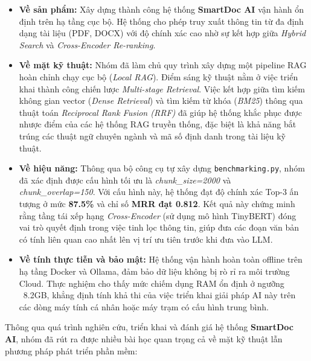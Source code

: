 ﻿\documentclass[10pt, conference, a4paper, compsocconf]{IEEEtran}
\begin{document}
\begin{itemize}
    \item \textbf{Về sản phẩm:} Xây dựng thành công hệ thống \textbf{SmartDoc AI} vận hành ổn định trên hạ tầng cục bộ. Hệ thống cho phép truy xuất thông tin từ đa định dạng tài liệu (PDF, DOCX) với độ chính xác cao nhờ sự kết hợp giữa \textit{Hybrid Search} và \textit{Cross-Encoder Re-ranking}.
   \item \textbf{Về mặt kỹ thuật:} Nhóm đã làm chủ quy trình xây dựng một pipeline RAG hoàn chỉnh chạy cục bộ (\textit{Local RAG}). Điểm sáng kỹ thuật nằm ở việc triển khai thành công chiến lược \textit{Multi-stage Retrieval}. Việc kết hợp giữa tìm kiếm không gian vector (\textit{Dense Retrieval}) và tìm kiếm từ khóa (\textit{BM25}) thông qua thuật toán \textit{Reciprocal Rank Fusion (RRF)} đã giúp hệ thống khắc phục được nhược điểm của các hệ thống RAG truyền thống, đặc biệt là khả năng bắt trúng các thuật ngữ chuyên ngành và mã số định danh trong tài liệu kỹ thuật.
    \item \textbf{Về hiệu năng:} Thông qua bộ công cụ tự xây dựng \texttt{benchmarking.py}, nhóm đã xác định được cấu hình tối ưu là \textit{chunk\_size=2000} và \textit{chunk\_overlap=150}. Với cấu hình này, hệ thống đạt độ chính xác Top-3 ấn tượng ở mức \textbf{87.5\%} và chỉ số \textbf{MRR đạt 0.812}. Kết quả này chứng minh rằng tầng tái xếp hạng \textit{Cross-Encoder} (sử dụng mô hình TinyBERT) đóng vai trò quyết định trong việc tinh lọc thông tin, giúp đưa các đoạn văn bản có tính liên quan cao nhất lên vị trí ưu tiên trước khi đưa vào LLM.
    \item \textbf{Về tính thực tiễn và bảo mật:} Hệ thống vận hành hoàn toàn offline trên hạ tầng Docker và Ollama, đảm bảo dữ liệu không bị rò rỉ ra môi trường Cloud. Thực nghiệm cho thấy mức chiếm dụng RAM ổn định ở ngưỡng ~8.2GB, khẳng định tính khả thi của việc triển khai giải pháp AI này trên các dòng máy tính cá nhân hoặc máy trạm có cấu hình trung bình.
\end{itemize}


Thông qua quá trình nghiên cứu, triển khai và đánh giá hệ thống \textbf{SmartDoc AI}, nhóm đã rút ra được nhiều bài học quan trọng cả về mặt kỹ thuật lẫn phương pháp phát triển phần mềm:
\end{document}
